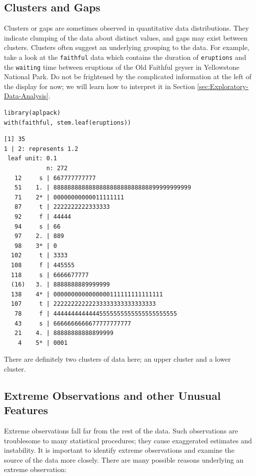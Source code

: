 \documentclass[captions=tableheading]{scrbook}
\begin{document}
\subsection{Clusters and Gaps}
\label{sec-3-2-4}

\label{sub:clusters-and-gaps}

Clusters or gaps are sometimes observed in quantitative data distributions. They indicate clumping of the data about distinct values, and gaps may exist between clusters. Clusters often suggest an underlying grouping to the data. For example, take a look at the \texttt{faithful} data which contains the duration of \texttt{eruptions} and the \texttt{waiting} time between eruptions of the Old Faithful geyser in Yellowstone National Park. Do not be frightened by the complicated information at the left of the display for now; we will learn how to interpret it in Section \ref{sec:Exploratory-Data-Analysis}.


\begin{verbatim}
library(aplpack)
with(faithful, stem.leaf(eruptions))
\end{verbatim}


\begin{verbatim}
[1] 35
1 | 2: represents 1.2
 leaf unit: 0.1
            n: 272
   12     s | 667777777777
   51    1. | 888888888888888888888888888899999999999
   71    2* | 00000000000011111111
   87     t | 2222222222333333
   92     f | 44444
   94     s | 66
   97    2. | 889
   98    3* | 0
  102     t | 3333
  108     f | 445555
  118     s | 6666677777
  (16)   3. | 8888888889999999
  138    4* | 0000000000000000111111111111111
  107     t | 22222222222233333333333333333
   78     f | 44444444444445555555555555555555555
   43     s | 6666666666677777777777
   21    4. | 88888888888899999
    4    5* | 0001
\end{verbatim}

There are definitely two clusters of data here; an upper cluster and a lower cluster. 
\subsection{Extreme Observations and other Unusual Features}
\label{sec-3-2-5}

\label{sub:Extreme-Observations-and}

Extreme observations fall far from the rest of the data. Such observations are troublesome to many statistical procedures; they cause exaggerated estimates and instability. It is important to identify extreme observations and examine the source of the data more closely. There are many possible reasons underlying an extreme observation:
\end{document}
